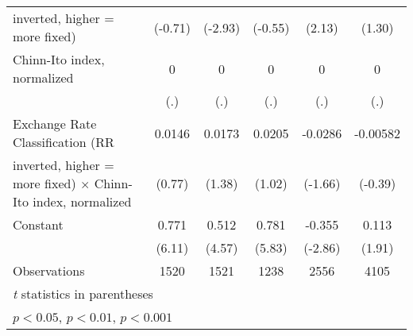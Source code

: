 \begin{table}[htbp]
\begin{tabular}{l*{5}{c}}
inverted, higher = more fixed)          &  (-0.71)         &  (-2.93)         &  (-0.55)         &   (2.13)         &   (1.30)         \\
\addlinespace
Chinn-Ito index, normalized             &        0         &        0         &        0         &        0         &        0         \\
                                        &      (.)         &      (.)         &      (.)         &      (.)         &      (.)         \\
\addlinespace
Exchange Rate Classification (RR        &   0.0146         &   0.0173         &   0.0205         &  -0.0286         & -0.00582         \\
inverted, higher = more fixed) $\times$ Chinn-Ito index, normalized&   (0.77)         &   (1.38)         &   (1.02)         &  (-1.66)         &  (-0.39)         \\
\addlinespace
Constant                                &    0.771\sym{***}&    0.512\sym{***}&    0.781\sym{***}&   -0.355\sym{**} &    0.113         \\
                                        &   (6.11)         &   (4.57)         &   (5.83)         &  (-2.86)         &   (1.91)         \\
\midrule
Observations                            &     1520         &     1521         &     1238         &     2556         &     4105         \\
\bottomrule
\multicolumn{6}{l}{\footnotesize \textit{t} statistics in parentheses}\\
\multicolumn{6}{l}{\footnotesize \sym{*} \(p<0.05\), \sym{**} \(p<0.01\), \sym{***} \(p<0.001\)}\\
\end{tabular}
\end{table}
